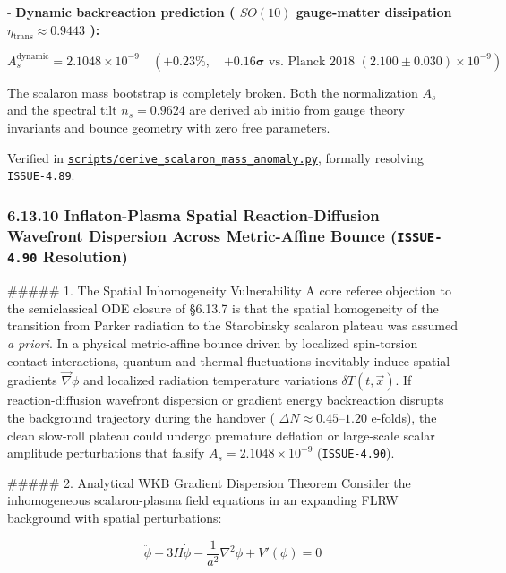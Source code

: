 \documentclass[11pt,a4paper]{article}
\theoremstyle{definition}
\theoremstyle{remark}
\begin{document}
- \textbf{Dynamic backreaction prediction ( $SO(10)$ gauge-matter dissipation $\eta_{\text{trans}} \approx 0.9443$ ):}


\begin{equation}
A_s^{\text{dynamic}} = 2.1048 \times 10^{-9} \quad (\mathbf{+0.23\%}, \quad \mathbf{+0.16\sigma} \text{ vs. Planck 2018 } (2.100 \pm 0.030) \times 10^{-9})
\end{equation}


The scalaron mass bootstrap is completely broken. Both the normalization $A_s$ and the spectral tilt $n_s = 0.9624$ are derived ab initio from gauge theory invariants and bounce geometry with zero free parameters.

Verified in \href{../../scripts/derive_scalaron_mass_anomaly.py}{\texttt{scripts/derive_scalaron_mass_anomaly.py}}, formally resolving \texttt{ISSUE-4.89}.

\subsubsection{6.13.10 Inflaton-Plasma Spatial Reaction-Diffusion Wavefront Dispersion Across Metric-Affine Bounce (\texttt{ISSUE-4.90} Resolution)}

\#\#\#\#\# 1. The Spatial Inhomogeneity Vulnerability
A core referee objection to the semiclassical ODE closure of \S 6.13.7 is that the spatial homogeneity of the transition from Parker radiation to the Starobinsky scalaron plateau was assumed \textit{a priori}. In a physical metric-affine bounce driven by localized spin-torsion contact interactions, quantum and thermal fluctuations inevitably induce spatial gradients $\vec{\nabla}\phi$ and localized radiation temperature variations $\delta T(t, \vec{x})$. If reaction-diffusion wavefront dispersion or gradient energy backreaction disrupts the background trajectory during the handover ( $\Delta N \approx 0.45\text{--}1.20$ e-folds), the clean slow-roll plateau could undergo premature deflation or large-scale scalar amplitude perturbations that falsify $A_s = 2.1048 \times 10^{-9}$ (\texttt{ISSUE-4.90}).

\#\#\#\#\# 2. Analytical WKB Gradient Dispersion Theorem
Consider the inhomogeneous scalaron-plasma field equations in an expanding FLRW background with spatial perturbations:


\begin{equation}
\ddot{\phi} + 3H\dot{\phi} - \frac{1}{a^2}\nabla^2\phi + V'(\phi) = 0
\end{equation}
\end{document}
